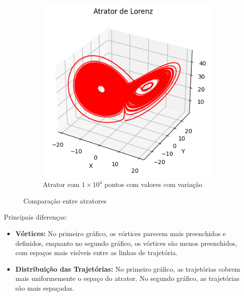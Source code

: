 \documentclass[12pt, a4paper]{article}
\begin{document}
\begin{figure}[H]
\begin{subfigure}{0.45\textwidth}
            \centering
            \includegraphics[width=\textwidth]{img/plotvaratrator.png}
            \caption{Atrator com $1 \times 10^4$ pontos com valores com variação}
            \label{fig:imagngfem2}
        \end{subfigure}
        \caption{Comparação entre atratores}
        \label{fig:duas_imajygens}
    \end{figure}
    
    Principais diferenças:
    \begin{itemize}
        \item \textbf{Vórtices:} No primeiro gráfico, os vórtices parecem mais
              preenchidos e definidos, enquanto no segundo gráfico, os vórtices são
              menos
              preenchidos, com espaços mais visíveis entre as linhas de trajetória.
    
        \item \textbf{Distribuição das Trajetórias: }No primeiro gráfico, as
              trajetórias cobrem mais uniformemente o espaço do atrator. No segundo
              gráfico,
              as trajetórias são mais espaçadas.
    \end{itemize}
    
\end{document}
